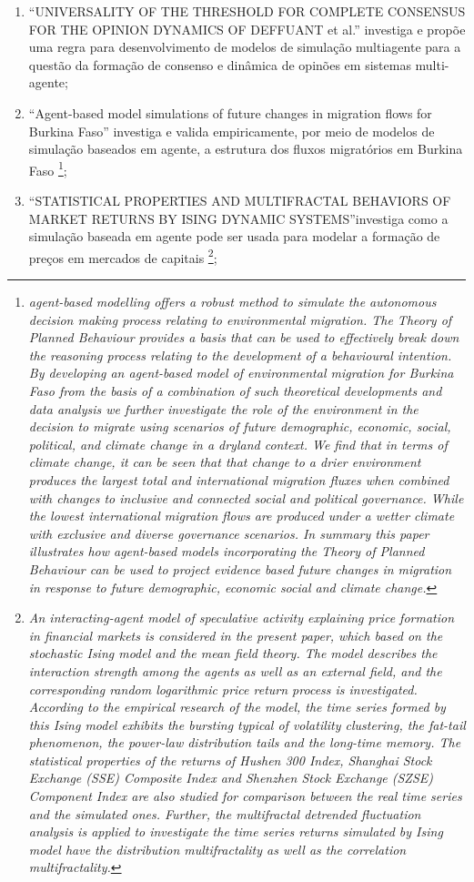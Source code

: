 \begin{enumerate}
\item ``UNIVERSALITY OF THE THRESHOLD FOR COMPLETE CONSENSUS FOR THE OPINION DYNAMICS OF DEFFUANT et al.'' investiga e propõe uma regra para desenvolvimento de modelos de simulação multiagente para a questão da formação de consenso e dinâmica de opinões em sistemas multi-agente;
\item ``Agent-based model simulations of future changes in migration flows for Burkina Faso'' investiga e valida empiricamente, por meio de modelos de simulação baseados em agente, a estrutura dos fluxos migratórios em Burkina Faso \footnote{\textit{agent-based modelling offers a robust method to simulate the autonomous decision making process relating to environmental migration. The Theory of Planned Behaviour provides a basis that can be used to effectively break down the reasoning process relating to the development of a behavioural intention. By developing an agent-based model of environmental migration for Burkina Faso from the basis of a combination of such theoretical developments and data analysis we further investigate the role of the environment in the decision to migrate using scenarios of future demographic, economic, social, political, and climate change in a dryland context. We find that in terms of climate change, it can be seen that that change to a drier environment produces the largest total and international migration fluxes when combined with changes to inclusive and connected social and political governance. While the lowest international migration flows are produced under a wetter climate with exclusive and diverse governance scenarios. In summary this paper illustrates how agent-based models incorporating the Theory of Planned Behaviour can be used to project evidence based future changes in migration in response to future demographic, economic social and climate change.}};
\item ``STATISTICAL PROPERTIES AND MULTIFRACTAL BEHAVIORS OF MARKET RETURNS BY ISING DYNAMIC SYSTEMS''investiga como a simulação baseada em agente pode ser usada para modelar a formação de preços em mercados de capitais \footnote{\textit{An interacting-agent model of speculative activity explaining price formation in financial markets is considered in the present paper, which based on the stochastic Ising model and the mean field theory. The model describes the interaction strength among the agents as well as an external field, and the corresponding random logarithmic price return process is investigated. According to the empirical research of the model, the time series formed by this Ising model exhibits the bursting typical of volatility clustering, the fat-tail phenomenon, the power-law distribution tails and the long-time memory. The statistical properties of the returns of Hushen 300 Index, Shanghai Stock Exchange (SSE) Composite Index and Shenzhen Stock Exchange (SZSE) Component Index are also studied for comparison between the real time series and the simulated ones. Further, the multifractal detrended fluctuation analysis is applied to investigate the time series returns simulated by Ising model have the distribution multifractality as well as the correlation multifractality.}};

\end{enumerate}
